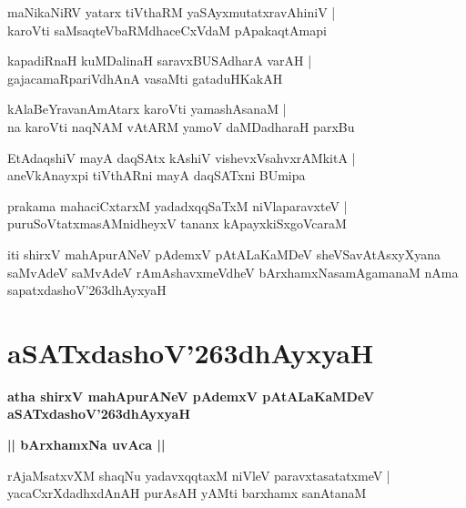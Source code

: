 \documentclass[twoside,12pt,openright]{book}
\def\S{\char'263}
\newcounter{shloka}[chapter]
\def\uvaca#1{\centerline{{\large\textbf{#1}}}}
\begin{document}
\begin{shloka}%
maNikaNiRV yatarx tiVthaRM yaSAyxmutatxravAhiniV |\\
karoVti saMsaqteVbaRMdhaceCxVdaM pApakaqtAmapi
\end{shloka}

\begin{shloka}%
kapadiRnaH kuMDalinaH saravxBUSAdharA varAH |\\
gajacamaRpariVdhAnA vasaMti gataduHKakAH 
\end{shloka}

\begin{shloka}%
kAlaBeYravanAmAtarx karoVti yamashAsanaM |\\
na karoVti naqNAM vAtARM yamoV daMDadharaH parxBu
\end{shloka}

\begin{shloka}%
EtAdaqshiV mayA daqSAtx kAshiV vishevxVsahvxrAMkitA |\\
aneVkAnayxpi tiVthARni mayA daqSATxni BUmipa
\end{shloka}

\begin{shloka}%
prakama mahaciCxtarxM yadadxqqSaTxM niVlaparavxteV |\\
puruSoVtatxmasAMnidheyxV tananx kApayxkiSxgoVcaraM 
\end{shloka}

\begin{center}
iti shirxV mahApurANeV pAdemxV pAtALaKaMDeV sheVSavAtAsxyXyana saMvAdeV 
saMvAdeV rAmAshavxmeVdheV bArxhamxNasamAgamanaM nAma sapatxdashoV\S dhAyxyaH
\end{center}

\chapter{aSATxdashoV\S dhAyxyaH}

\begin{center}
{\LARGE\bfseries atha shirxV mahApurANeV pAdemxV pAtALaKaMDeV aSATxdashoV\S dhAyxyaH}
\end{center}

\uvaca{|| bArxhamxNa uvAca ||}

\begin{shloka}%
rAjaMsatxvXM shaqNu yadavxqqtaxM niVleV paravxtasatatxmeV |\\
yacaCxrXdadhxdAnAH purAsAH yAMti barxhamx sanAtanaM 
\end{shloka}
\end{document}
